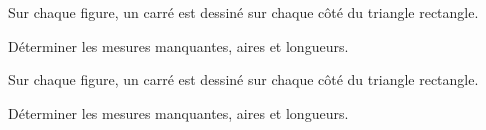 \begin{exercice*}
    Sur chaque figure, un carré est dessiné sur chaque côté du triangle rectangle.

    Déterminer les mesures manquantes, aires et longueurs.

    \hspace*{-17mm}
\end{exercice*}
\begin{corrige}
    Sur chaque figure, un carré est dessiné sur chaque côté du triangle rectangle.

    Déterminer les mesures manquantes, aires et longueurs.

    \hspace*{-8mm}\hspace*{-3mm}
\end{corrige}

